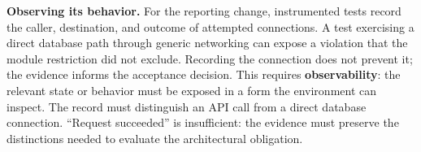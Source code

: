 





\textbf{Observing its behavior.} For the reporting change, instrumented tests record the caller, destination, and outcome of attempted connections. A test exercising a direct database path through generic networking can expose a violation that the module restriction did not exclude. Recording the connection does not prevent it; the evidence informs the acceptance decision. This requires \textbf{observability}: the relevant state or behavior must be exposed in a form the environment can inspect. The record must distinguish an API call from a direct database connection. ``Request succeeded'' is insufficient: the evidence must preserve the distinctions needed to evaluate the architectural obligation.





